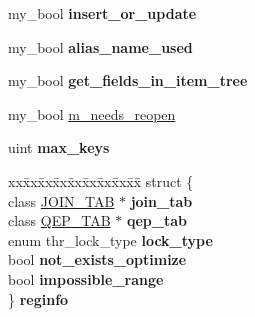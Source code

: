 \begin{DoxyCompactItemize}
\item 
\mbox{\label{structTABLE_a0bc4aa765153ca2537c201e6191cb1e3}} 
my\+\_\+bool {\bfseries insert\+\_\+or\+\_\+update}
\item 
\mbox{\label{structTABLE_a45046eadb292eaed7b6cb0c65d4dcee3}} 
my\+\_\+bool {\bfseries alias\+\_\+name\+\_\+used}
\item 
\mbox{\label{structTABLE_a8e32ec72f999c22686a8307aaf09a746}} 
my\+\_\+bool {\bfseries get\+\_\+fields\+\_\+in\+\_\+item\+\_\+tree}
\item 
my\+\_\+bool \mbox{\hyperlink{structTABLE_a3cfec9aee859fac059aa0f7cbecfbc92}{m\+\_\+needs\+\_\+reopen}}
\item 
\mbox{\label{structTABLE_a34eff226c2435c5aac5cba939383931d}} 
uint {\bfseries max\+\_\+keys}
\item 
\mbox{\label{structTABLE_a3bf86a63fe36539e57890646c1f45b7a}} 
\begin{tabbing}
xx\=xx\=xx\=xx\=xx\=xx\=xx\=xx\=xx\=\kill
struct \{\\
\>class \mbox{\hyperlink{classJOIN__TAB}{JOIN\_TAB}} $\ast$ {\bfseries join\_tab}\\
\>class \mbox{\hyperlink{classQEP__TAB}{QEP\_TAB}} $\ast$ {\bfseries qep\_tab}\\
\>enum thr\_lock\_type {\bfseries lock\_type}\\
\>bool {\bfseries not\_exists\_optimize}\\
\>bool {\bfseries impossible\_range}\\
\} {\bfseries reginfo}\\


\end{tabbing}
\end{DoxyCompactItemize}
